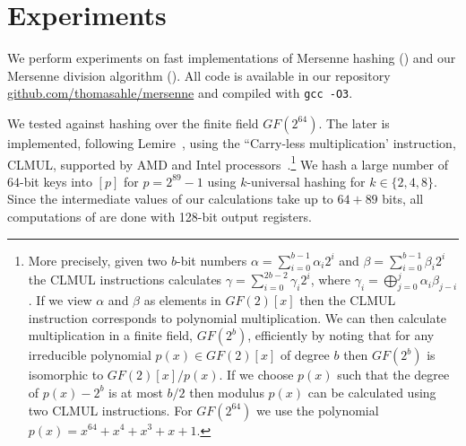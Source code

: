 \section{Experiments}\label{sec:experiments}
We perform experiments on fast implementations of Mersenne hashing () and our Mersenne division algorithm ().
All code is available in our repository\\\href{https://github.com/thomasahle/mersenne/}{github.com/thomasahle/mersenne} and compiled with \texttt{gcc -O3}.

We tested  against hashing over the finite field $GF(2^{64})$.
The later is implemented, following Lemire~\cite{lemire2014strongly}, using the ``Carry-less multiplication' instruction, CLMUL, supported by AMD and Intel processors~\cite{GUERON2010549}.\footnote{
More precisely, given two $b$-bit numbers $\alpha = \sum_{i = 0}^{b - 1} \alpha_i 2^i$ and $\beta = \sum_{i = 0}^{b - 1} \beta_i 2^i$
the CLMUL instructions calculates $\gamma = \sum_{i = 0}^{2b - 2} \gamma_i 2^i$, where $\gamma_i = \bigoplus_{j = 0}^{j} \alpha_i \beta_{j - i}$.
If we view $\alpha$ and $\beta$ as elements in $GF(2)[x]$ then the CLMUL instruction corresponds to polynomial multiplication.
We can then calculate multiplication in a finite field, $GF(2^b)$, efficiently by noting that for any irreducible polynomial $p(x) \in GF(2)[x]$
of degree $b$ then $GF(2^b)$ is isomorphic to $GF(2)[x] / p(x)$. If we choose $p(x)$ such that the degree of $p(x) - 2^{b}$ is at
most $b/2$ then modulus $p(x)$ can be calculated using two CLMUL instructions.
For $GF(2^{64})$ we use the polynomial $p(x) = x^{64} + x^4 + x^3 + x + 1$.
}
%
We hash a large number of $64$-bit keys into $[p]$ for $p=2^{89}-1$ using $k$-universal hashing for $k \in \{2, 4, 8\}$.
Since the intermediate values of our calculations take up to $64 + 89$ bits, all computations of  are done with 128-bit output registers.

